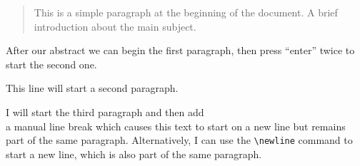 \documentclass{article}
\begin{document}
\begin{abstract}
  This is a simple paragraph at the beginning of the
  document. A brief introduction about the main subject.
\end{abstract}

After our abstract we can begin the first paragraph, then press
``enter'' twice to start the second one.

This line will start a second paragraph.

I will start the third paragraph and then add \\ a manual line break
which causes this text to start on a new line but remains part of the
same paragraph. Alternatively, I can use the \verb|\newline|\newline
command to start a new line, which is also part of the same paragraph.
\end{document}
